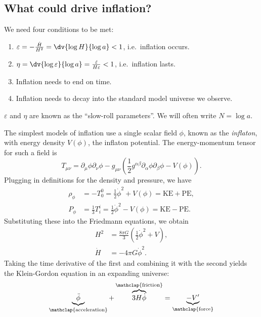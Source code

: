 \documentclass{jknotes}
\begin{document}
\subsection{What could drive inflation?}
We need four conditions to be met:
\begin{enumerate}
    \item \(\varepsilon = -\frac{\dot{H}}{H^2} = \dv{\log H}{\log a} < 1\), i.e.\ inflation occurs.
    \item \(\eta = \dv{\log \varepsilon}{\log a} = \frac{\dot{\varepsilon}}{H\varepsilon} < 1\), i.e.\ inflation lasts.
    \item Inflation needs to end on time.
    \item Inflation needs to decay into the standard model universe we observe.
\end{enumerate}
\(\varepsilon\) and \(\eta\) are known as the ``slow-roll parameters''. We will often write \(N=\log a\).

The simplest models of inflation use a single scalar field \(\phi\), known as the \emph{inflaton}, with energy density \(V(\phi)\), the inflaton potential. The energy-momentum tensor for such a field is
\begin{equation}
    T_{\mu\nu}=\partial_\mu\phi\partial_\nu\phi - g_{\mu\nu}\left(\frac{1}{2}g^{\alpha\beta}\partial_\alpha\phi\partial_\beta\phi - V(\phi)\right).
\end{equation}
Plugging in definitions for the density and pressure, we have
\begin{align}
    \rho_\phi &= -T_0^0 = \frac12\dot\phi^2+V(\phi) = \text{KE} + \text{PE},\\
    P_\phi &= \frac{1}{3}T_i^i = \frac12\dot\phi^2-V(\phi) = \text{KE} - \text{PE}.
\end{align}
Substituting these into the Friedmann equations, we obtain
\begin{align}
    H^2 &= \frac{8\pi G}3 \left(\frac12\dot\phi^2+V\right),\\
    \dot{H} &= -4\pi G\dot\phi^2.
\end{align}
Taking the time derivative of the first and combining it with the second yields the Klein-Gordon equation in an expanding universe:
\begin{equation}
    \underbrace{\ddot\phi}_{\mathclap{\text{acceleration}}} + \overbrace{3H\dot\phi}^{\mathclap{\text{friction}}} = \underbrace{-V'}_{\mathclap{\text{force}}}
\end{equation}
\end{document}
